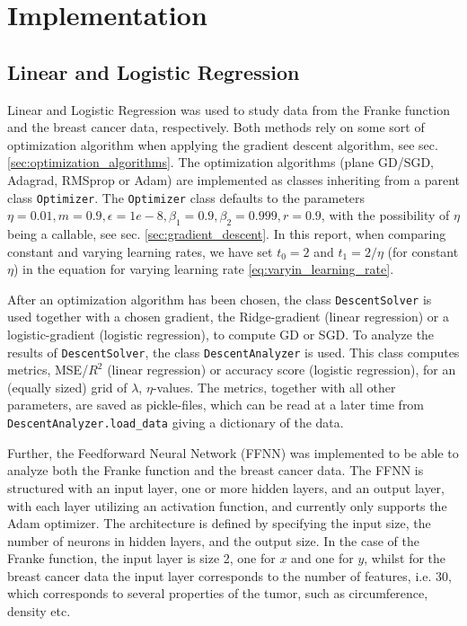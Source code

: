 \documentclass[%
reprint,s
amsmath,amssymb,
aps,
]{revtex4-2}
\begin{document}
\section{Implementation}
\subsection{Linear and Logistic Regression}
Linear and Logistic Regression was used to study data from the Franke function and the breast cancer data, respectively. Both methods rely on some sort of optimization algorithm when applying the gradient descent algorithm, see sec. \ref{sec:optimization_algorithms}. The optimization algorithms (plane GD/SGD, Adagrad, RMSprop or Adam) are implemented as classes inheriting from a parent class \texttt{Optimizer}. The \texttt{Optimizer} class defaults to the parameters \(\eta=0.01, m=0.9, \epsilon=1e-8, \beta_1=0.9, \beta_2=0.999, r=0.9\), with the possibility of \(\eta\) being a callable, see sec. \ref{sec:gradient_descent}. In this report, when comparing constant and varying learning rates, we have set \(t_0 = 2\) and \(t_{1} = 2/\eta\) (for constant \(\eta\)) in the equation for varying learning rate \eqref{eq:varyin_learning_rate}.

After an optimization algorithm has been chosen, the class \texttt{DescentSolver} is used together with a chosen gradient, the Ridge-gradient (linear regression) or a logistic-gradient (logistic regression), to compute GD or SGD. To analyze the results of \texttt{DescentSolver}, the class \texttt{DescentAnalyzer} is used. This class computes metrics, MSE/\(R^2\) (linear regression) or accuracy score (logistic regression), for an (equally sized) grid of \(\lambda\), \(\eta\)-values. The metrics, together with all other parameters, are saved as pickle-files, which can be read at a later time from \texttt{DescentAnalyzer.load\_data} giving a dictionary of the data. 

Further, the Feedforward Neural Network (FFNN) was implemented to be able to analyze both the Franke function and the breast cancer data. The FFNN is structured with an input layer, one or more hidden layers, and an output layer, with each layer utilizing an activation function, and currently only supports the Adam optimizer. The architecture is defined by specifying the input size, the number of neurons in hidden layers, and the output size. In the case of the Franke function, the input layer is size 2, one for $x$ and one for $y$, whilst for the breast cancer data the input layer corresponds to the number of features, i.e. $30$, which corresponds to several properties of the tumor, such as circumference, density etc. 
\end{document}
